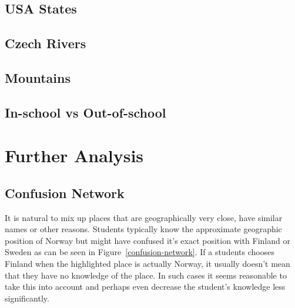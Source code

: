\subsection*{USA States}

\subsection*{Czech Rivers}

\subsection*{Mountains}

\subsection*{In-school vs Out-of-school}

\section{Further Analysis}
\label{further-analysis}

\subsection{Confusion Network}

It is natural to mix up places that are geographically very close, have similar names or other reasons. Students typically know the approximate geographic position of Norway but might have confused it's exact position with Finland or Sweden as can be seen in Figure~\ref{confusion-network}. If a students chooses Finland when the highlighted place is actually Norway, it usually doesn't mean that they have no knowledge of the place. In such cases it seems reasonable to take this into account and perhaps even decrease the student's knowledge less significantly.

